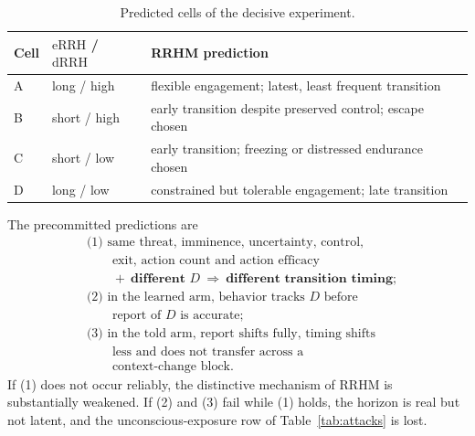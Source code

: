 \documentclass[9pt,twocolumn]{article}
\newcommand{\eRRH}{\mathrm{eRRH}}
\newcommand{\dRRH}{\mathrm{dRRH}}
\begin{document}
\begin{table}[!t]
\centering
\caption{Predicted cells of the decisive experiment.}
\label{tab:cells}
\small
\begin{tabular}{llp{}}
\toprule
Cell & $\eRRH$ / $\dRRH$ & RRHM prediction \\
\midrule
A & long / high & flexible engagement; latest, least frequent transition \\
B & short / high & early transition despite preserved control; escape chosen \\
C & short / low & early transition; freezing or distressed endurance chosen \\
D & long / low & constrained but tolerable engagement; late transition \\
\bottomrule
\end{tabular}
\end{table}

The precommitted predictions are
\[
\boxed{
\begin{aligned}
&\text{(1) same threat, imminence, uncertainty, control,}\\[-0.1em]
&\qquad\text{exit, action count and action efficacy}\\[-0.1em]
&\qquad+\ \textbf{different }D\ \Rightarrow\ \textbf{different transition timing};\\[-0.1em]
&\text{(2) in the learned arm, behavior tracks }D\text{ before}\\[-0.1em]
&\qquad\text{report of }D\text{ is accurate};\\[-0.1em]
&\text{(3) in the told arm, report shifts fully, timing shifts}\\[-0.1em]
&\qquad\text{less and does not transfer across a}\\[-0.1em]
&\qquad\text{context-change block.}
\end{aligned}}
\]
If (1) does not occur reliably, the distinctive mechanism of RRHM is substantially weakened. If (2) and (3) fail while (1) holds, the horizon is real but not latent, and the unconscious-exposure row of Table~\ref{tab:attacks} is lost.
\end{document}
